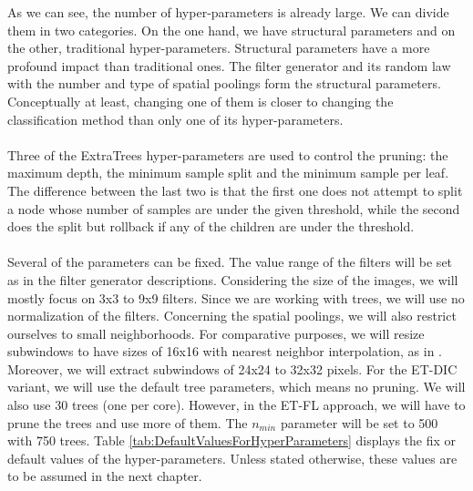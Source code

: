 \documentclass[a4paper]{report}
\newlength{\larg}
\begin{document}
	As we can see, the number of hyper-parameters is already large. We can divide them in two categories. On the one hand, we have structural parameters and on the other, traditional hyper-parameters. Structural parameters have a more profound impact than traditional ones. The filter generator and its random law with the number and type of spatial poolings form the structural parameters. Conceptually at least, changing one of them is closer to changing the classification method than only one of its hyper-parameters.
	\paragraph{}
	Three of the ExtraTrees hyper-parameters are used to control the pruning: the maximum depth, the minimum sample split and the minimum sample per leaf. The difference between the last two is that the first one does not attempt to split a node whose number of samples are under the given threshold, while the second does the split but rollback if any of the children are under the threshold. 
	\paragraph{}
	Several of the parameters can be fixed. The value range of the filters will be set as in the filter generator descriptions. Considering the size of the images, we will mostly focus on 3x3 to 9x9 filters. Since we are working with trees, we will use no normalization of the filters. Concerning the spatial poolings, we will also restrict ourselves to small neighborhoods. For comparative purposes, we will resize subwindows to have sizes of 16x16 with nearest neighbor interpolation, as in \cite{base}. Moreover, we will extract subwindows of 24x24 to 32x32 pixels. For the ET-DIC variant, we will use the default tree parameters, which means no pruning. We will also use 30 trees (one per core). However, in the ET-FL approach, we will have to prune the trees and use more of them. The $n_{min}$ parameter will be set to 500 with 750 trees. Table \ref{tab:DefaultValuesForHyperParameters} displays the fix or default values of the hyper-parameters. Unless stated otherwise, these values are to be assumed in the next chapter.
	
\end{document}
